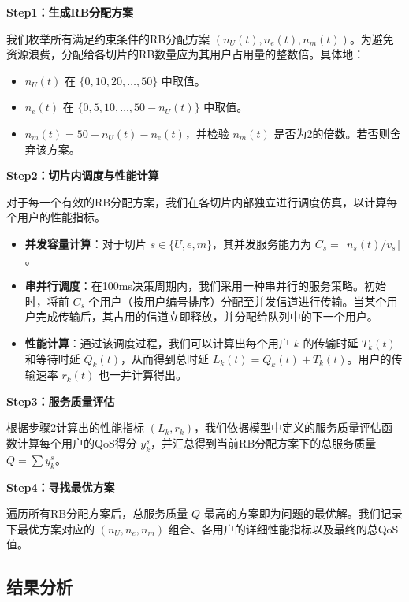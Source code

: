 \textbf{Step1：生成RB分配方案}

我们枚举所有满足约束条件的RB分配方案 $(n_U(t), n_e(t), n_m(t))$。为避免资源浪费，分配给各切片的RB数量应为其用户占用量的整数倍。具体地：
\begin{itemize}
    \item $n_U(t)$ 在 $\{0, 10, 20, \dots, 50\}$ 中取值。
    \item $n_e(t)$ 在 $\{0, 5, 10, \dots, 50 - n_U(t)\}$ 中取值。
    \item $n_m(t) = 50 - n_U(t) - n_e(t)$，并检验 $n_m(t)$ 是否为2的倍数。若否则舍弃该方案。
\end{itemize}

\textbf{Step2：切片内调度与性能计算}

对于每一个有效的RB分配方案，我们在各切片内部独立进行调度仿真，以计算每个用户的性能指标。
\begin{itemize}
    \item \textbf{并发容量计算}：对于切片 $s \in \{U, e, m\}$，其并发服务能力为 $C_s = \lfloor n_s(t) / v_s \rfloor$。
    \item \textbf{串并行调度}：在100ms决策周期内，我们采用一种串并行的服务策略。初始时，将前 $C_s$ 个用户（按用户编号排序）分配至并发信道进行传输。当某个用户完成传输后，其占用的信道立即释放，并分配给队列中的下一个用户。
    \item \textbf{性能计算}：通过该调度过程，我们可以计算出每个用户 $k$ 的传输时延 $T_k(t)$ 和等待时延 $Q_k(t)$，从而得到总时延 $L_k(t) = Q_k(t) + T_k(t)$。用户的传输速率 $r_k(t)$ 也一并计算得出。
\end{itemize}

\textbf{Step3：服务质量评估}

根据步骤2计算出的性能指标 $(L_k, r_k)$，我们依据模型中定义的服务质量评估函数计算每个用户的QoS得分 $y_k^s$，并汇总得到当前RB分配方案下的总服务质量 $Q = \sum y_k^s$。

\textbf{Step4：寻找最优方案}

遍历所有RB分配方案后，总服务质量 $Q$ 最高的方案即为问题的最优解。我们记录下最优方案对应的 $(n_U, n_e, n_m)$ 组合、各用户的详细性能指标以及最终的总QoS值。

\subsection{结果分析}

